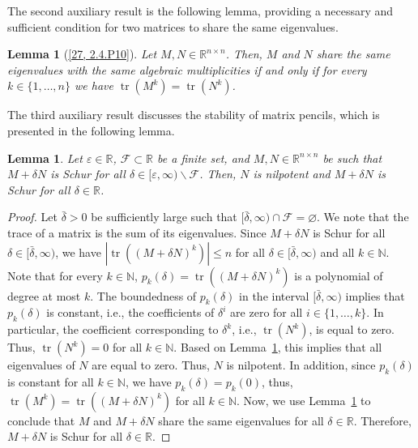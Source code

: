 \documentclass[10pt,a4paper]{amsart}
\DeclareMathOperator{\tr}{tr}
\newtheorem{lemma}[theorem]{Lemma}
\begin{document}
The second auxiliary result is the following lemma, providing a necessary and sufficient condition for two matrices to share the same eigenvalues.

\begin{lemma}[{\href{https://arxiv.org/abs/2510.25452v3}{[27, 2.4.P10]}}]
\label{lem:horn_2.4.P10}
Let $M,N\in\mathbb{R}^{n\times n}$. Then, $M$ and $N$ share the same eigenvalues with the same algebraic multiplicities \emph{if and only if} for every $k\in\{1,\ldots,n\}$ we have $\tr(M^k)=\tr(N^k)$. 
\end{lemma}

The third auxiliary result discusses the stability of matrix pencils, which is presented in the following lemma.

\begin{lemma}
\label{lem:A+delta*B}
Let $\varepsilon\in\mathbb{R}$, $\mathcal{F}\subset\mathbb{R}$ be a finite set, and $M,N\in\mathbb{R}^{n\times n}$ be such that $M+\delta N$ is Schur for all $\delta\in[\varepsilon,\infty)\backslash\mathcal{F}$. Then, $N$ is nilpotent and $M+\delta N$ is Schur for all $\delta\in\mathbb{R}$. 
\end{lemma}
\begin{proof}
Let $\bar{\delta}>0$ be sufficiently large such that $[\bar{\delta},\infty)\cap\mathcal{F}=\varnothing$. We note that the trace of a matrix is the sum of its eigenvalues. Since $M+\delta N$ is Schur for all $\delta\in[\bar{\delta},\infty)$, we have $|\tr ((M+\delta N)^k)|\leq n$ for all $\delta\in[\bar{\delta},\infty)$ and all $k\in\mathbb{N}$. Note that for every $k\in\mathbb{N}$, \mbox{$p_k(\delta)= \tr ((M+\delta N)^k)$} is a polynomial of degree at most $k$. The boundedness of $p_k(\delta)$ in the interval $[\bar{\delta},\infty)$ implies that $p_k(\delta)$ is constant, i.e., the coefficients of $\delta^i$ are zero for all $i\in\{1,\ldots,k\}$. In particular, the coefficient corresponding to $\delta^k$, i.e., $\tr(N^k)$, is equal to zero. Thus, $\tr(N^k)=0$ for all $k\in\mathbb{N}$. Based on Lemma~\ref{lem:horn_2.4.P10}, this implies that all eigenvalues of $N$ are equal to zero. Thus, $N$ is nilpotent. In addition, since $p_k(\delta)$ is constant for all $k\in\mathbb{N}$, we have $p_k(\delta)=p_k(0)$, thus, \mbox{$\tr(M^k)=\tr((M+\delta N)^k)$} for all $k\in\mathbb{N}$. Now, we use Lemma~\ref{lem:horn_2.4.P10} to conclude that $M$ and $M+\delta N$ share the same eigenvalues for all $\delta\in\mathbb{R}$. Therefore, $M+\delta N$ is Schur for all $\delta\in\mathbb{R}$. 
\end{proof}
\end{document}
